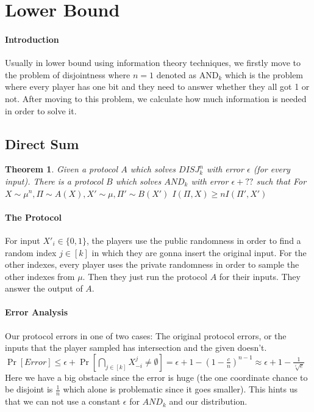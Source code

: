 \documentclass{article}
\theoremstyle{plain}
\newtheorem{theorem}{Theorem}[section]
\begin{document}
\section{Lower Bound}
\paragraph{Introduction}
Usually in lower bound using information theory techniques, we firstly move to the problem of disjointness where $n=1$ denoted as $\text{AND}_k$ which is the problem where every player has one bit and they need to answer whether they all got 1 or not. After moving to this problem, we calculate how much information is needed in order to solve it.
\subsection{Direct Sum}
\begin{theorem}
Given a protocol $A$ which solves $DISJ^n_k$ with error $\epsilon$ (for every input). There is a protocol $B$ which solves $AND_k$ with error $\epsilon + ??$ such that \newline
For $X \sim \mu^n, \Pi \sim A(X), X' \sim \mu, \Pi ' \sim B(X') $ \newline
$I(\Pi, X) \geq n I(\Pi ', X')$
\end{theorem}
\paragraph{The Protocol}
For input $X'_i \in \{0, 1\}$, the players use the public randomness in order to find a random index $j \in [k]$ in which they are gonna insert the original input. For the other indexes, every player uses the private randomness in order to sample the other indexes from $\mu$. Then they just run the protocol $A$ for their inputs. They answer the output of $A$. 

\paragraph{Error Analysis}
Our protocol errors in one of two cases: The original protocol errors, or the inputs that the player sampled has intersection and the given doesn't. \newline
$\Pr[Error] \leq \epsilon + \Pr[\underset{j \in [k]}{\bigcap } X^j_{-i} \neq \emptyset] = \epsilon + 1 - (1 - \frac{c}{n})^{n-1} \approx \epsilon + 1 - \frac{1}{\sqrt[c]{e}}$ \newline
Here we have a big obstacle since the error is huge (the one coordinate chance to be disjoint is $\frac{1}{n}$ which alone is problematic since it goes smaller). This hints us that we can not use a constant $\epsilon$ for $AND_k$ and our distribution.
\end{document}
